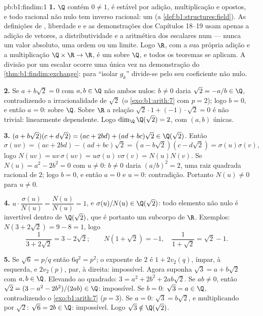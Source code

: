 \begin{solution}{pb:b1:findim:1}
\textbf{1.} $\Q$ contém $0 \neq 1$, é estável por adição, multiplicação
e opostos, e todo racional não nulo tem inverso racional: um 
(a \cref{def:b1:structures:field}). As definições de , liberdade e  e as
demonstrações dos Capítulos 18--19 usam apenas a adição de
vetores, a distributividade e a aritmética dos escalares num 
--- nunca um valor absoluto, uma ordem ou um limite. Logo $\R$,
com a sua própria adição e a multiplicação $\Q \times \R \to \R$, é um  sobre $\Q$, e todos os teoremas se aplicam. A divisão por
um escalar ocorre uma única vez na demonstração do \cref{thm:b1:findim:exchange}: para
``isolar $g_k$'' divide-se pelo seu coeficiente não nulo.

\textbf{2.} Se $a + b\sqrt2 = 0$ com $a, b \in \Q$ não ambos nulos: $b \neq 0$ daria $\sqrt2 = -a/b \in \Q$,
contradizendo a irracionalidade de $\sqrt2$ (o \cref{exo:b1:arith:7} com $p = 2$);
logo $b = 0$, e então $a = 0$:  sobre $\Q$. Sobre $\R$ a
relação $\sqrt2\cdot 1 + (-1)\cdot\sqrt2 = 0$ é não trivial: linearmente dependente. Logo $\dim_\Q \Q(\sqrt2) = 2$,
com  $(a, b)$ únicas.

\textbf{3.} $(a + b\sqrt2)(c + d\sqrt2) = (ac + 2bd) + (ad +
bc)\sqrt2 \in \Q(\sqrt2)$. Então
\[
\sigma(uv) = (ac + 2bd) - (ad + bc)\sqrt2
= (a - b\sqrt2)(c - d\sqrt2) = \sigma(u)\sigma(v),
\]
logo $N(uv) = uv\,\sigma(uv) = u\sigma(u)\,v\sigma(v) = N(u)N(v)$.
Se $N(u) = a^2 - 2b^2 = 0$ com $u \neq 0$: $b \neq 0$ daria $(a/b)^2 = 2$, uma raiz quadrada racional
de $2$; logo $b = 0$, e então $a = 0$ e $u = 0$: contradição.
Portanto $N(u) \neq 0$ para $u \neq
0$.

\textbf{4.} $u \cdot \dfrac{\sigma(u)}{N(u)} = \dfrac{N(u)}{N(u)}
= 1$, e $\sigma(u)/N(u) \in \Q(\sqrt2)$: todo elemento não nulo é invertível
dentro de $\Q(\sqrt2)$, que é portanto um subcorpo de $\R$. Exemplos:
$N(3 + 2\sqrt2) = 9 - 8 = 1$, logo
\[
\frac1{3 + 2\sqrt2} = 3 - 2\sqrt2 ;
\qquad
N(1 + \sqrt2) = -1, \quad
\frac1{1 + \sqrt2} = \sqrt2 - 1 .
\]

\textbf{5.} Se $\sqrt6 = p/q$ então $6q^2 = p^2$; o expoente de $2$ é $1 + 2v_2(q)$,
ímpar, à esquerda, e $2v_2(p)$, par, à direita: impossível. Agora
suponha $\sqrt3 = a + b\sqrt2$ com $a, b \in \Q$. Elevando ao quadrado: $3 = a^2 + 2b^2 + 2ab\sqrt2$. Se $ab
\neq 0$,
então $\sqrt2 = (3 - a^2 - 2b^2)/(2ab) \in \Q$: impossível. Se $b = 0$: $\sqrt3 = a \in \Q$, contradizendo o \cref{exo:b1:arith:7}
($p = 3$). Se $a = 0$: $\sqrt3 = b\sqrt2$, e multiplicando por $\sqrt2$:
$\sqrt6 = 2b \in \Q$: impossível. Logo $\sqrt3 \notin \Q(\sqrt2)$.


\end{solution}
